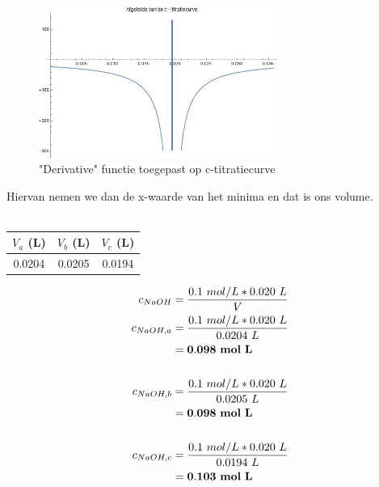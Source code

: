 \documentclass[10pt,twoside]{report}
\begin{document}
\begin{figure}[H]
    \centering
    \includegraphics[width=0.7\textwidth]{c_derivative.jpg}
    \caption{"Derivative" functie toegepast op c-titratiecurve}
\end{figure}
Hiervan nemen we dan de x-waarde van het minima en dat is ons volume.\\\\
\begin{tabular}{|c|c|c|}
    \hline
    $V_{a}$ (L) & $V_{b}$ (L) & $V_{c}$ (L) \\\hline
    0.0204 & 0.0205 & 0.0194 \\\hline
\end{tabular}

\begin{equation*}
    \begin{split}
        c_{NaOH} &= \frac{0.1\ mol/L * 0.020\ L}{V}\\
        c_{NaOH,a} &= \frac{0.1\ mol/L * 0.020\ L}{0.0204\ L}\\
            &= \bold{0.098\ mol\ L}\\\\
        c_{NaOH,b} &= \frac{0.1\ mol/L * 0.020\ L}{0.0205\ L}\\
            &= \bold{0.098\ mol\ L}\\\\
        c_{NaOH,c} &= \frac{0.1\ mol/L * 0.020\ L}{0.0194\ L}\\
            &= \bold{0.103\ mol\ L}\\
    \end{split}
\end{equation*}
\end{document}

